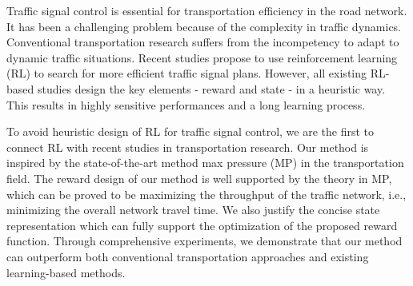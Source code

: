 
\begin{abstract}


\end{abstract}

\begin{englishabstract}
Traffic signal control is essential for transportation efficiency in the road network. It has been a challenging problem because of the complexity in traffic dynamics. Conventional transportation research suffers from the incompetency to adapt to dynamic traffic situations. Recent studies propose to use reinforcement learning (RL) to search for more efficient traffic signal plans. However, all existing RL-based studies design the key elements - reward and state - in a heuristic way. This results in highly sensitive performances and a long learning process.

To avoid heuristic design of RL for traffic signal control, we are the first to connect RL with recent studies in transportation research. Our method is inspired by the state-of-the-art method max pressure (MP) in the transportation field. The reward design of our method is well supported by the theory in MP, which can be proved to be maximizing the throughput of the traffic network, i.e., minimizing the overall network travel time. We also justify the concise state representation which can fully support the optimization of the proposed reward function. Through comprehensive experiments, we demonstrate that our method can outperform both conventional transportation approaches and existing learning-based methods.

\end{englishabstract}

